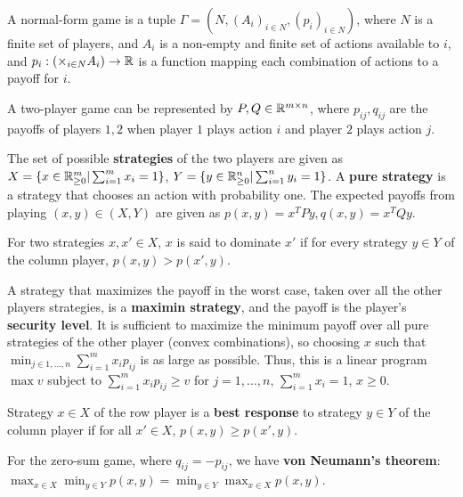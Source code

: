 \begin{defn}
  \label{sec:non-coop-games-1}
  A normal-form game is a tuple $\Gamma = (N, (A_{i})_{i \in N},
  (p_{i})_{i \in N})$, where $N$ is a finite set of players, and
  $A_{i}$ is a non-empty  and finite set of actions available to $i$,
  and $p_{i}: (\times_{i \in N} A_{i}) \rightarrow \mathbb{R}$ is a function
  mapping each combination of actions to a payoff for $i$.

  A two-player game can be represented by $P, Q \in \mathbb{R}^{m \times n}$,
  where $p_{ij}, q_{ij}$ are the payoffs of players $1, 2$ when player
  $1$ plays action $i$ and player $2$ plays action $j$.

  The set of possible \textbf{strategies} of the two players are given
  as $X = \{ x \in \mathbb{R}^{m}_{\geq 0} | \sum_{i=1}^{m} x_{i} = 1 \} $, $Y
  = \{ y \in \mathbb{R}^{n}_{\geq 0} | \sum_{i=1}^{n} y_{i} = 1 \}$. A
  \textbf{pure strategy} is a strategy that chooses an action with
  probability one. The expected payoffs from playing $(x, y) \in (X,
  Y)$ are given as $p(x, y) = x^{T} P y, q(x, y) = x^{T} Q y$.

  For two strategies $x, x' \in X$, $x$ is said to dominate $x'$ if
  for every strategy $y \in Y$ of the column player, $p(x, y) > p(x',
  y)$.

  A strategy that maximizes the payoff in the worst case, taken over
  all the other players strategies, is a \textbf{maximin strategy}, and
  the payoff is the player's \textbf{security level}.  It is
  sufficient to maximize the minimum payoff over all pure strategies
  of the other player (convex combinations), so choosing $x$ such that
  $\min_{j \in 1, \dots, n} \sum_{i=1}^{m} x_{i} p_{ij}$ is as large
  as possible.  Thus, this is a linear program $\max v$ subject to
  $\sum_{i=1}^{m} x_{i} p_{ij} \geq v$ for $j = 1, \dots, n$,
  $\sum_{i=1}^{m} x_{i} = 1$, $x \geq 0$.

  Strategy $x \in X$ of the row player is a \textbf{best response} to
  strategy $y \in Y$ of the column player if for all $x' \in X$, $p(x,
  y) \geq p(x', y)$.
\end{defn}

\begin{thm}
  \label{sec:non-coop-games-3}
  For the zero-sum game, where $q_{ij} = -p_{ij}$, we have \textbf{von
    Neumann's theorem}: $\max_{x \in X} \min_{y \in Y} p(x, y) =
  \min_{y \in Y} \max_{x \in X} p(x, y)$.
\end{thm}


